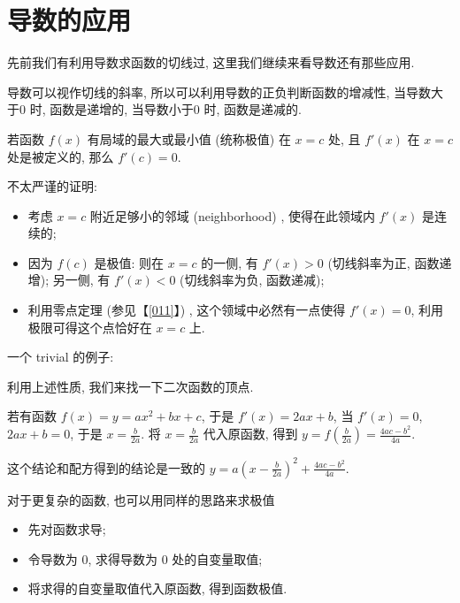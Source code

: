 \section{导数的应用}\label{015}

先前我们有利用导数求函数的切线过, 这里我们继续来看导数还有那些应用.

\begin{tcolorbox}[size=fbox, breakable, enhanced jigsaw, title={一次导和极值}]

导数可以视作切线的斜率, 所以可以利用导数的正负判断函数的增减性,
当导数大于$0$ 时, 函数是递增的, 当导数小于$0$ 时, 函数是递减的.

若函数 $f(x)$ 有局域的最大或最小值 (统称极值) 在 $x=c$ 处, 且
$f'(x)$ 在 $x=c$ 处是被定义的, 那么 $f'(c)=0$.

\begin{newquote}
不太严谨的证明:

\begin{itemize}

\item
  考虑 $x=c$ 附近足够小的邻域 (neighborhood) , 使得在此领域内
  $f'(x)$ 是连续的;
\item
  因为 $f(c)$ 是极值: 则在 $x=c$ 的一侧, 有 $f'(x)>0$
  (切线斜率为正, 函数递增); 另一侧, 有 $f'(x)<0$ (切线斜率为负,
  函数递减);
\item
  利用零点定理 (参见【\ref{011}】) , 这个领域中必然有一点使得 $f'(x)=0$,
  利用极限可得这个点恰好在 $x=c$ 上.
\end{itemize}
\end{newquote}

\begin{newquote}
一个 trivial 的例子:

利用上述性质, 我们来找一下二次函数的顶点.

若有函数 $f(x)=y=ax^2+bx+c$, 于是 $f'(x)=2ax+b$, 当 $f'(x)=0$,
$2ax+b=0$, 于是 $x=\frac{b}{2a}$. 将 $x=\frac{b}{2a}$ 代入原函数,
得到 $y=f\left(\frac{b}{2a}\right)=\frac{4ac-b^2}{4a}$.

这个结论和配方得到的结论是一致的
$y=a\left(x-\frac{b}{2a}\right)^2+\frac{4ac-b^2}{4a}$.
\end{newquote}

对于更复杂的函数, 也可以用同样的思路来求极值

\begin{itemize}

\item
  先对函数求导;
\item
  令导数为 $0$, 求得导数为 $0$ 处的自变量取值;
\item
  将求得的自变量取值代入原函数, 得到函数极值.
\end{itemize}

\end{tcolorbox}

